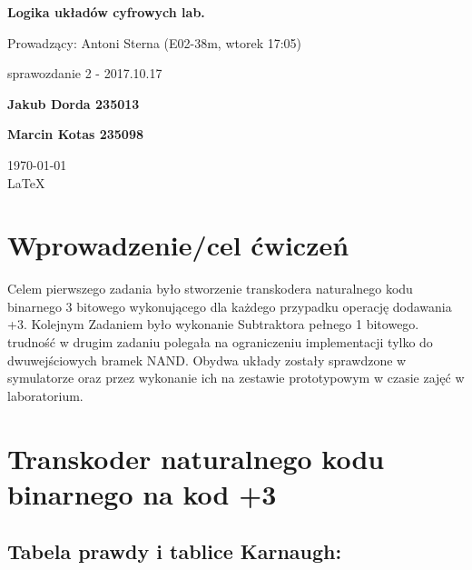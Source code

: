 \documentclass[12pt,a4paper]{article}
\begin{document}
	
	\begin{titlepage}
		
		\centering
		{\huge\bfseries Logika układów cyfrowych lab.\par}
		
		\vspace{0.5cm}
		Prowadzący: Antoni Sterna (E02-38m, wtorek 17:05) \\
	
		\vspace{1.1cm}
		{\Large sprawozdanie 2 - 2017.10.17\par}
		\vfill
		
		{\large\bfseries Jakub Dorda 235013\par}
		{\large\bfseries Marcin Kotas 235098\par}
		
		\vspace{1cm}
		\today \\ \LaTeX
		
		\restoregeometry
	\end{titlepage}

	
	\section{Wprowadzenie/cel ćwiczeń}
	
		Celem pierwszego zadania było stworzenie transkodera naturalnego kodu binarnego 3 bitowego wykonującego dla każdego przypadku operację dodawania +3. Kolejnym Zadaniem było wykonanie Subtraktora pełnego 1 bitowego. trudność w drugim zadaniu polegała na ograniczeniu implementacji tylko do dwuwejściowych bramek NAND. Obydwa układy zostały sprawdzone w symulatorze oraz przez wykonanie ich na zestawie prototypowym w czasie zajęć w laboratorium. 
	
	\section{Transkoder naturalnego kodu binarnego na kod +3}
		
		\subsection{Tabela prawdy i tablice Karnaugh:}
			
\end{document}
